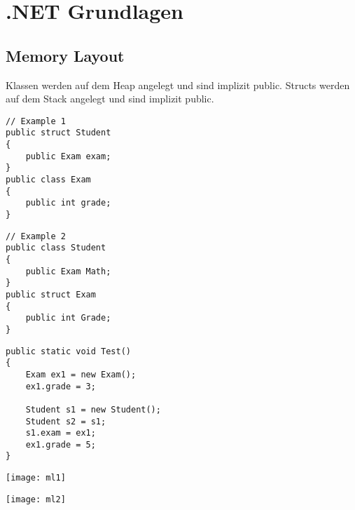 \section{.NET Grundlagen}

\subsection{Memory Layout}
Klassen werden auf dem Heap angelegt und sind implizit public. Structs werden auf dem Stack angelegt und sind implizit public. \\
\begin{minipage}{0,33\linewidth}
\begin{lstlisting}
// Example 1
public struct Student
{
	public Exam exam;
}
public class Exam
{
	public int grade;
}
\end{lstlisting}  
\end{minipage}
\begin{minipage}{0,33\linewidth}
\begin{lstlisting}
// Example 2
public class Student
{
	public Exam Math;
}
public struct Exam
{
	public int Grade;
}
\end{lstlisting}  
\end{minipage}
\begin{minipage}{0,33\linewidth}
\begin{lstlisting}
public static void Test()
{
	Exam ex1 = new Exam();
	ex1.grade = 3;
	
	Student s1 = new Student();
	Student s2 = s1;
	s1.exam = ex1;
	ex1.grade = 5;
}
\end{lstlisting}
\end{minipage}

\begin{minipage}{0,5\linewidth}
	\texttt{[image: ml1]}
\end{minipage}
\begin{minipage}{0,5\linewidth}
 	\texttt{[image: ml2]}
\end{minipage}
